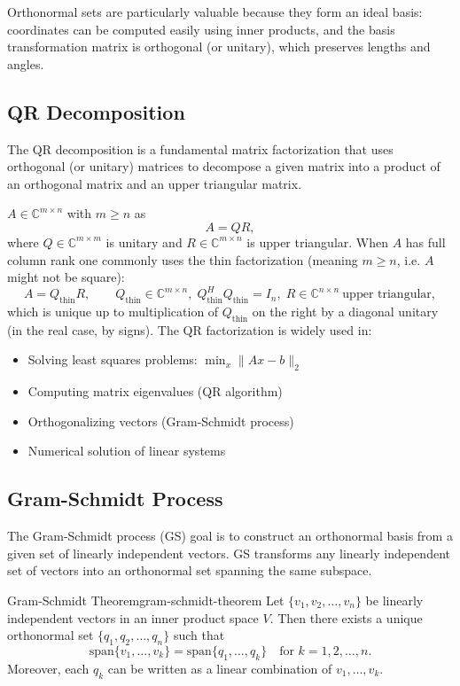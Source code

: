 \documentclass[../../main.tex]{subfiles}
\begin{document}
Orthonormal sets are particularly valuable because they form an ideal basis: coordinates can be computed easily using inner products, and the basis transformation matrix is orthogonal (or unitary), which preserves lengths and angles.

\subsection{QR Decomposition}
The QR decomposition is a fundamental matrix factorization that uses orthogonal (or unitary) matrices to decompose a given matrix into a product of an orthogonal matrix and an upper triangular matrix.


$A\in\mathbb{C}^{m\times n}$ with $m\ge n$ as
\[
    A = QR,
\]
where $Q\in\mathbb{C}^{m\times m}$ is unitary and $R\in\mathbb{C}^{m\times n}$ is upper triangular.
When $A$ has full column rank one commonly uses the thin factorization (meaning $m\ge n$, i.e. $A$ might not be square):
\[
    A = Q_{\mathrm{thin}} R,\qquad Q_{\mathrm{thin}}\in\mathbb{C}^{m\times n},\;Q_{\mathrm{thin}}^H Q_{\mathrm{thin}}=I_n,\;R\in\mathbb{C}^{n\times n}\ \text{upper triangular},
\]
which is unique up to multiplication of $Q_{\mathrm{thin}}$ on the right by a diagonal unitary (in the real case, by signs). The QR factorization is widely used in:
\begin{itemize}
    \item Solving least squares problems: $\min_x \|Ax - b\|_2$
    \item Computing matrix eigenvalues (QR algorithm)
    \item Orthogonalizing vectors (Gram-Schmidt process)
    \item Numerical solution of linear systems
\end{itemize}

\subsection{Gram-Schmidt Process}
The Gram-Schmidt process (GS) goal is to construct an orthonormal basis from a given set of linearly independent vectors.
GS transforms any linearly independent set of vectors into an orthonormal set spanning the same subspace.

\begin{theorem}{Gram-Schmidt Theorem}{gram-schmidt-theorem}
    Let $\{v_1, v_2, \ldots, v_n\}$ be linearly independent vectors in an inner product space $V$. Then there exists a unique orthonormal set $\{q_1, q_2, \ldots, q_n\}$ such that
    \[
        \text{span}\{v_1, \ldots, v_k\} = \text{span}\{q_1, \ldots, q_k\} \quad \text{for } k = 1, 2, \ldots, n.
    \]
    Moreover, each $q_k$ can be written as a linear combination of $v_1, \ldots, v_k$.
\end{theorem}
\end{document}
